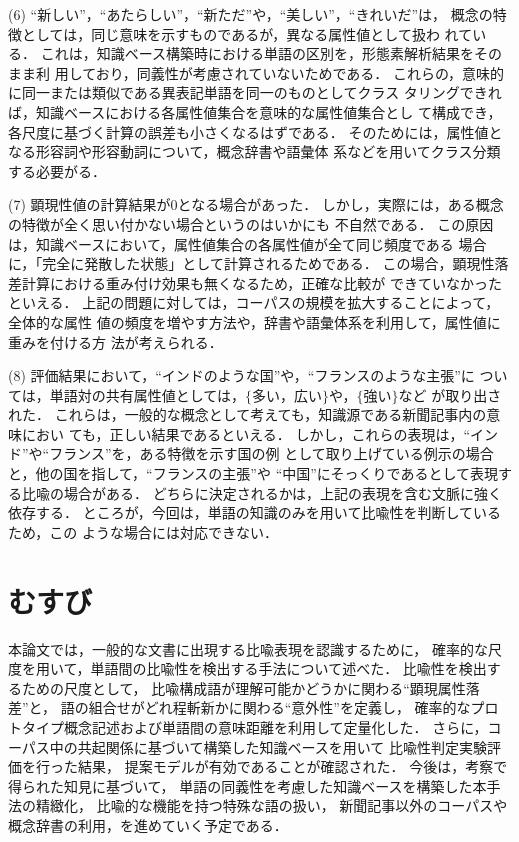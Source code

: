 (6)
``新しい''，``あたらしい''，``新ただ''や，``美しい''，``きれいだ''は，
概念の特徴としては，同じ意味を示すものであるが，異なる属性値として扱わ
れている．
これは，知識ベース構築時における単語の区別を，形態素解析結果をそのまま利
用しており，同義性が考慮されていないためである．
これらの，意味的に同一または類似である異表記単語を同一のものとしてクラス
タリングできれば，知識ベースにおける各属性値集合を意味的な属性値集合とし
て構成でき，各尺度に基づく計算の誤差も小さくなるはずである．
そのためには，属性値となる形容詞や形容動詞について，概念辞書や語彙体
系などを用いてクラス分類する必要がる．

(7)
顕現性値の計算結果が0となる場合があった．
しかし，実際には，ある概念の特徴が全く思い付かない場合というのはいかにも
不自然である．
この原因は，知識ベースにおいて，属性値集合の各属性値が全て同じ頻度である
場合に，「完全に発散した状態」として計算されるためである．
この場合，顕現性落差計算における重み付け効果も無くなるため，正確な比較が
できていなかったといえる．
上記の問題に対しては，コーパスの規模を拡大することによって，全体的な属性
値の頻度を増やす方法や，辞書や語彙体系を利用して，属性値に重みを付ける方
法が考えられる．

(8)
評価結果において，``インドのような国''や，``フランスのような主張''に
ついては，単語対の共有属性値としては，$\{多い，広い\}$や，$\{強い\}$など
が取り出された．
これらは，一般的な概念として考えても，知識源である新聞記事内の意味におい
ても，正しい結果であるといえる．
しかし，これらの表現は，``インド''や``フランス''を，ある特徴を示す国の例
として取り上げている例示の場合と，他の国を指して，``フランスの主張''や
``中国''にそっくりであるとして表現する比喩の場合がある．
どちらに決定されるかは，上記の表現を含む文脈に強く依存する．
ところが，今回は，単語の知識のみを用いて比喩性を判断しているため，この
ような場合には対応できない．

\section{むすび}\label{conc}
本論文では，一般的な文書に出現する比喩表現を認識するために，
確率的な尺度を用いて，単語間の比喩性を検出する手法について述べた．
比喩性を検出するための尺度として，
比喩構成語が理解可能かどうかに関わる``顕現属性落差''と，
語の組合せがどれ程斬新かに関わる``意外性''を定義し，
確率的なプロトタイプ概念記述および単語間の意味距離を利用して定量化した．
さらに，コーパス中の共起関係に基づいて構築した知識ベースを用いて
比喩性判定実験評価を行った結果，
提案モデルが有効であることが確認された．
今後は，考察で得られた知見に基づいて，
単語の同義性を考慮した知識ベースを構築した本手法の精緻化，
比喩的な機能を持つ特殊な語の扱い，
新聞記事以外のコーパスや概念辞書の利用，を進めていく予定である．

